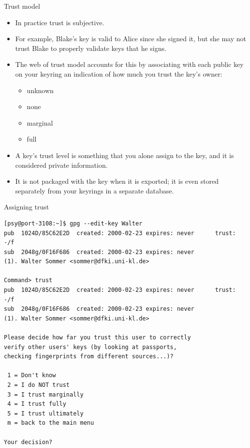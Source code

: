 \documentclass[%
mode=present,%
paper=smartboard,
size=20pt,
]{powerdot}
\begin{document}
\begin{slide}{Trust model}
  \begin{itemize}
  \item In practice trust is subjective.
  \item For example, Blake's key is valid to Alice since she signed
    it, but she may not trust Blake to properly validate keys that he
    signs.
  \item The web of trust model accounts for this by associating with
    each public key on your keyring an indication of how much you
    trust the key's owner:
    \begin{itemize}
    \item unknown
    \item none
    \item marginal
    \item full
    \end{itemize}
  \item A key's trust level is something that you alone assign to the
    key, and it is considered private information.
  \item It is not packaged with the key when it is exported; it is
    even stored separately from your keyrings in a separate database.
  \end{itemize}
\end{slide}

\begin{slide}[method=direct]{Assigning trust}
\begin{verbatim}
[psy@port-3108:~]$ gpg --edit-key Walter
pub  1024D/85C62E2D  created: 2000-02-23 expires: never      trust: -/f
sub  2048g/0F16F686  created: 2000-02-23 expires: never
(1). Walter Sommer <sommer@dfki.uni-kl.de>

Command> trust
pub  1024D/85C62E2D  created: 2000-02-23 expires: never      trust: -/f
sub  2048g/0F16F686  created: 2000-02-23 expires: never
(1). Walter Sommer <sommer@dfki.uni-kl.de>

Please decide how far you trust this user to correctly
verify other users' keys (by looking at passports,
checking fingerprints from different sources...)?

 1 = Don't know
 2 = I do NOT trust
 3 = I trust marginally
 4 = I trust fully
 5 = I trust ultimately
 m = back to the main menu

Your decision?  
\end{verbatim}%
\end{slide}
\end{document}
